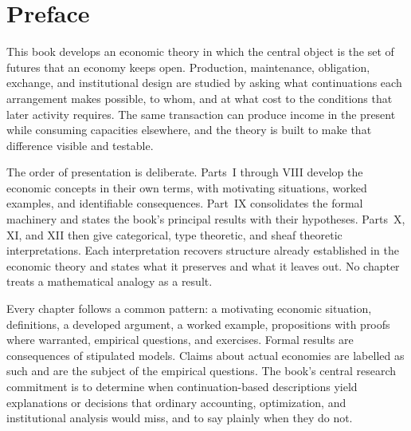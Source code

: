 \chapter*{Preface}

This book develops an economic theory in which the central object is the set of futures that an economy keeps open. Production, maintenance, obligation, exchange, and institutional design are studied by asking what continuations each arrangement makes possible, to whom, and at what cost to the conditions that later activity requires. The same transaction can produce income in the present while consuming capacities elsewhere, and the theory is built to make that difference visible and testable.

The order of presentation is deliberate. Parts~I through VIII develop the economic concepts in their own terms, with motivating situations, worked examples, and identifiable consequences. Part~IX consolidates the formal machinery and states the book's principal results with their hypotheses. Parts~X, XI, and XII then give categorical, type theoretic, and sheaf theoretic interpretations. Each interpretation recovers structure already established in the economic theory and states what it preserves and what it leaves out. No chapter treats a mathematical analogy as a result.

Every chapter follows a common pattern: a motivating economic situation, definitions, a developed argument, a worked example, propositions with proofs where warranted, empirical questions, and exercises. Formal results are consequences of stipulated models. Claims about actual economies are labelled as such and are the subject of the empirical questions. The book's central research commitment is to determine when continuation-based descriptions yield explanations or decisions that ordinary accounting, optimization, and institutional analysis would miss, and to say plainly when they do not.


